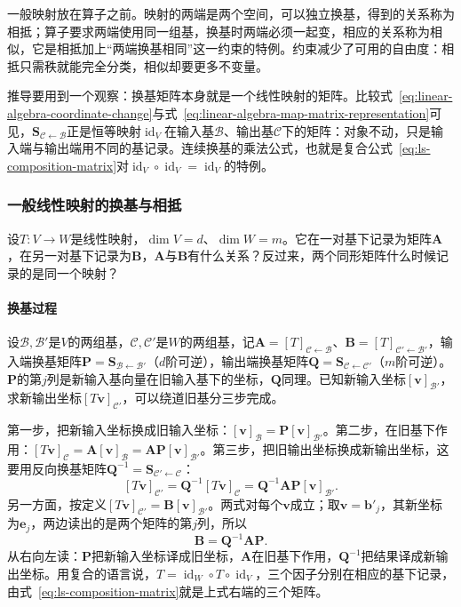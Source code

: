 一般映射放在算子之前。映射的两端是两个空间，可以独立换基，得到的关系称为相抵；算子要求两端使用同一组基，换基时两端必须一起变，相应的关系称为相似，它是相抵加上“两端换基相同”这一约束的特例。约束减少了可用的自由度：相抵只需秩就能完全分类，相似却要更多不变量。

推导要用到一个观察：换基矩阵本身就是一个线性映射的矩阵。比较式~\eqref{eq:linear-algebra-coordinate-change}与式~\eqref{eq:linear-algebra-map-matrix-representation}可见，$\bm S_{\mathcal C\leftarrow\mathcal B}$正是恒等映射$\operatorname{id}_V$在输入基$\mathcal B$、输出基$\mathcal C$下的矩阵：对象不动，只是输入端与输出端用不同的基记录。连续换基的乘法公式，也就是复合公式~\eqref{eq:ls-composition-matrix}对$\operatorname{id}_V\circ\operatorname{id}_V=\operatorname{id}_V$的特例。

\subsubsection{一般线性映射的换基与相抵}
\label{sec:ls-equivalence-matrices}

设$T:V\to W$是线性映射，$\dim V=d$、$\dim W=m$。它在一对基下记录为矩阵$\bm A$，在另一对基下记录为$\bm B$，$\bm A$与$\bm B$有什么关系？反过来，两个同形矩阵什么时候记录的是同一个映射？

\paragraph{换基过程}
设$\mathcal B,\mathcal B'$是$V$的两组基，$\mathcal C,\mathcal C'$是$W$的两组基，记$\bm A=[T]_{\mathcal C\leftarrow\mathcal B}$、$\bm B=[T]_{\mathcal C'\leftarrow\mathcal B'}$，输入端换基矩阵$\bm P=\bm S_{\mathcal B\leftarrow\mathcal B'}$（$d$阶可逆），输出端换基矩阵$\bm Q=\bm S_{\mathcal C\leftarrow\mathcal C'}$（$m$阶可逆）。$\bm P$的第$j$列是新输入基向量在旧输入基下的坐标，$\bm Q$同理。已知新输入坐标$[\bm v]_{\mathcal B'}$，求新输出坐标$[T\bm v]_{\mathcal C'}$，可以绕道旧基分三步完成。

第一步，把新输入坐标换成旧输入坐标：$[\bm v]_{\mathcal B}=\bm P[\bm v]_{\mathcal B'}$。第二步，在旧基下作用：$[T\bm v]_{\mathcal C}=\bm A[\bm v]_{\mathcal B}=\bm A\bm P[\bm v]_{\mathcal B'}$。第三步，把旧输出坐标换成新输出坐标，这要用反向换基矩阵$\bm Q^{-1}=\bm S_{\mathcal C'\leftarrow\mathcal C}$：
\[
 [T\bm v]_{\mathcal C'}=\bm Q^{-1}[T\bm v]_{\mathcal C}=\bm Q^{-1}\bm A\bm P[\bm v]_{\mathcal B'}.
\]
另一方面，按定义$[T\bm v]_{\mathcal C'}=\bm B[\bm v]_{\mathcal B'}$。两式对每个$\bm v$成立；取$\bm v=\bm b'_j$，其新坐标为$\bm e_j$，两边读出的是两个矩阵的第$j$列，所以
\begin{equation}
 \bm B=\bm Q^{-1}\bm A\bm P.
 \label{eq:ls-equivalence-transform}
\end{equation}
从右向左读：$\bm P$把新输入坐标译成旧坐标，$\bm A$在旧基下作用，$\bm Q^{-1}$把结果译成新输出坐标。用复合的语言说，$T=\operatorname{id}_W\circ T\circ\operatorname{id}_V$，三个因子分别在相应的基下记录，由式~\eqref{eq:ls-composition-matrix}就是上式右端的三个矩阵。

